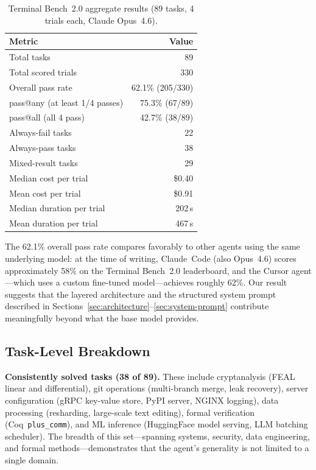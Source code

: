\documentclass{article}
\begin{document}
\begin{table}[h]
\centering
\caption{Terminal Bench~2.0 aggregate results (89 tasks, 4 trials each, Claude Opus~4.6).}
\label{tab:tb2-aggregate}
\begin{tabular}{lr}
\toprule
\textbf{Metric} & \textbf{Value} \\
\midrule
Total tasks              & 89 \\
Total scored trials      & 330 \\
Overall pass rate        & 62.1\% (205/330) \\
pass@any (at least 1/4 passes) & 75.3\% (67/89) \\
pass@all (all 4 pass)    & 42.7\% (38/89) \\
Always-fail tasks        & 22 \\
Always-pass tasks        & 38 \\
Mixed-result tasks       & 29 \\
Median cost per trial    & \$0.40 \\
Mean cost per trial      & \$0.91 \\
Median duration per trial & 202\,s \\
Mean duration per trial  & 467\,s \\
\bottomrule
\end{tabular}
\end{table}

The 62.1\% overall pass rate compares favorably to other agents
using the same underlying model: at the time of writing, Claude~Code
(also Opus~4.6) scores approximately 58\% on the Terminal Bench~2.0
leaderboard, and the Cursor agent---which uses a custom fine-tuned
model---achieves roughly 62\%.  Our result suggests that the layered
architecture and the structured system prompt described in
Sections~\ref{sec:architecture}--\ref{sec:system-prompt} contribute
meaningfully beyond what the base model provides.

\subsection{Task-Level Breakdown}

\textbf{Consistently solved tasks (38 of 89).}
These include cryptanalysis (FEAL linear and differential), git
operations (multi-branch merge, leak recovery), server configuration
(gRPC key-value store, PyPI server, NGINX logging), data processing
(resharding, large-scale text editing), formal verification
(Coq~\texttt{plus\_comm}), and ML inference (HuggingFace model serving,
LLM batching scheduler).  The breadth of this set---spanning systems,
security, data engineering, and formal methods---demonstrates that the
agent's generality is not limited to a single domain.
\end{document}
